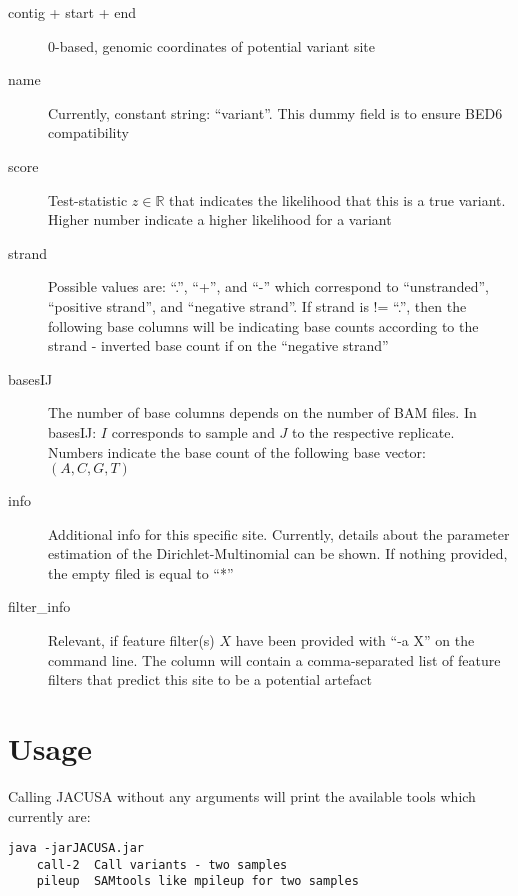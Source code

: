 \documentclass[10pt, a4paper]{article}
\begin{document}
\begin{description}
\item[contig + start + end] 0-based, genomic coordinates of potential variant site
\item[name] Currently, constant string: ``variant''. This dummy field is to ensure BED6
compatibility
\item[score] Test-statistic $z \in \mathbb{R}$ that indicates the likelihood that this is a true
variant. Higher number indicate a higher likelihood for a variant
\item[strand] Possible values are: ``.'', ``+'', and ``-'' which correspond to ``unstranded'',
``positive strand'', and ``negative strand''. If strand is != ``.'', then the following base columns
will be indicating base counts according to the strand - inverted base count if on the ``negative
strand''
\item[basesIJ] The number of base columns depends on the number of BAM files. In basesIJ: $I$
corresponds to sample and $J$ to the respective replicate. Numbers indicate the base count of the
following base vector: $(A, C, G, T)$
\item[info] Additional info for this specific site. Currently, details about the parameter
estimation of the Dirichlet-Multinomial can be shown. If nothing provided, the empty filed is equal
to ``*''
\item[filter\_info] Relevant, if feature filter(s) $X$ have been provided with ``-a X'' on the
command line. The column will contain a comma-separated list of feature filters that predict this
site to be a potential artefact
\end{description}
\section{Usage}
Calling JACUSA without any arguments will print the available tools which currently are:
\begin{verbatim}
java -jarJACUSA.jar
	call-2  Call variants - two samples
    pileup  SAMtools like mpileup for two samples
\end{verbatim}
\end{document}

